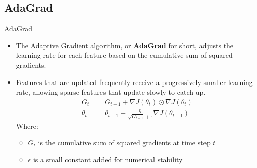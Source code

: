 \documentclass[serif, aspectratio=169]{beamer}
\begin{document}

\subsection{AdaGrad}
\begin{frame}{AdaGrad}
       \begin{itemize}
    \item The Adaptive Gradient algorithm, or \textbf{AdaGrad} for short, adjusts the learning rate for each feature based on the cumulative sum of squared gradients.
    \item Features that are updated frequently receive a progressively smaller learning rate, allowing sparse features that update slowly to catch up.
        \begin{align*}
        G_t &= G_{t-1} + \nabla J(\theta_t) \odot \nabla J(\theta_t) \\
        \theta_{t} &= \theta_{t-1}- \frac{\eta}{\sqrt{G_{t-1}} + \epsilon} \nabla J(\theta_{t-1})
        \end{align*}
        Where:
        \begin{itemize}
            \item $G_t$ is the cumulative sum of squared gradients at time step $t$
            \item $\epsilon$ is a small constant added for numerical stability
        \end{itemize}
    \end{itemize}
\end{frame}
\end{document}
